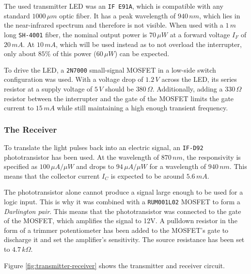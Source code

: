The used transmitter LED was an \texttt{IF E91A}, which is compatible with any standard \(1000\,\mu m\) optic fiber. It has a peak wavelength of \(940\,nm\), which lies in the near-infrared spectrum and therefore is not visible. When used with a \(1\,m\) long \texttt{SH-4001} fiber, the nominal output power is \(70\,\mu W\) at a forward voltage \(I_F\) of \(20\,mA\). At \(10\,mA\), which will be used instead as to not overload the interrupter, only about \(85\%\) of this power (\(60\,\mu W\)) can be expected.

To drive the LED, a \texttt{2N7000} small-signal MOSFET in a low-side switch configuration was used. With a voltage drop of \(1.2\,V\) across the LED, its series resistor at a supply voltage of \(5\,V\) should be \(380\,\Omega\). Additionally, adding a \(330\,\Omega\) resistor between the interrupter and the gate of the MOSFET limits the gate current to \(15\,mA\) while still maintaining a high enough transient frequency.

\subsubsection{The Receiver}

To translate the light pulses back into an electric signal, an \texttt{IF-D92} phototransistor has been used. At the wavelength of \(870\,nm\), the responsivity is specified as \(100\,\mu A/\mu W\) and drops to \(94\,\mu A/\mu W\) for a wavelength of \(940\,nm\). This means that the collector current \(I_C\) is expected to be around \(5.6\,mA\).

The phototransistor alone cannot produce a signal large enough to be used for a logic input. This is why it was combined with a \texttt{RUM001L02} MOSFET to form a \emph{Darlington pair}. This means that the phototransistor was connected to the gate of the MOSFET, which amplifies the signal to 12V. A pulldown resistor in the form of a trimmer potentiometer has been added to the MOSFET's gate to discharge it and set the amplifier's sensitivity. The source resistance has been set to \(4.7\,k\Omega\).

Figure \ref{fig:transmitter-receiver} shows the transmitter and receiver circuit.


